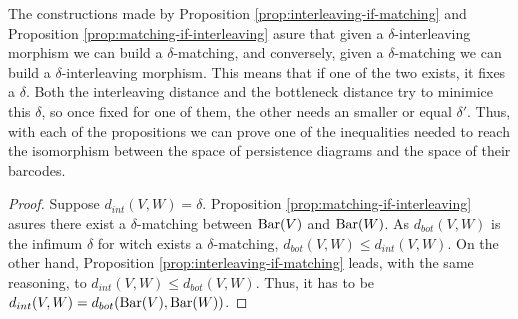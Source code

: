 The constructions made by Proposition \ref{prop:interleaving-if-matching} and Proposition \ref{prop:matching-if-interleaving} asure that given a $\delta$-interleaving morphism we can build a $\delta$-matching, and conversely, given a $\delta$-matching we can build a $\delta$-interleaving morphism. This means that if one of the two exists, it fixes a $\delta$. Both the interleaving distance and the bottleneck distance try to minimice this $\delta$, so once fixed for one of them, the other needs an smaller or equal $\delta'$. Thus, with each of the propositions we can prove one of the inequalities needed to reach the isomorphism between the space of persistence diagrams and the space of their barcodes.

\Stability*
\begin{proof}
    Suppose $ d_{int}(V, W) = \delta $. Proposition \ref{prop:matching-if-interleaving} asures there exist a $\delta$-matching between $ \operatorname{Bar}(V) $ and $ \operatorname{Bar} (W) $. As $ d_{bot}(V, W) $ is the infimum $\delta$ for witch exists a $\delta$-matching, $ d_{bot}(V, W) \leq d_{int}(V, W)$. On the other hand, Proposition \ref{prop:interleaving-if-matching} leads, with the same reasoning, to $ d_{int}(V, W) \leq d_{bot}(V, W)$. Thus, it has to be $ d_{int} (V, W) = d_{bot} (\operatorname{Bar}(V), \operatorname{Bar}(W)) $.
\end{proof}